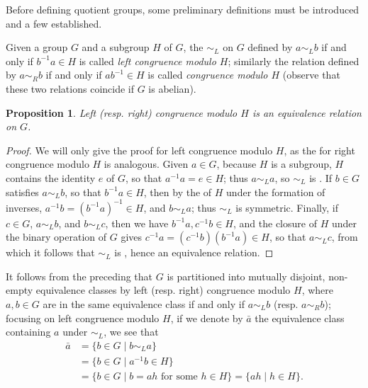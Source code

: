 \documentclass[12pt]{article}
\theoremstyle{plain}
\newtheorem*{proposition*}{Proposition}
\theoremstyle{definition}
\newcommand{\set}[1]{\{#1\}}
\begin{document}
Before defining quotient groups, some preliminary definitions must be introduced and a few  established.

Given a group $G$ and a subgroup $H$ of $G$, the  $\sim_L$ on $G$ defined by $a\sim_L b$ if and only 
if $b^{-1}a\in H$ is called \emph{left congruence modulo $H$}; similarly the relation defined by $a\sim_R b$ if 
and only if $ab^{-1}\in H$ is called \emph{ congruence modulo $H$} (observe that these two relations coincide if $G$ is abelian). 
\begin{proposition*}
Left (resp. right) congruence modulo $H$ is an equivalence relation on $G$.
\end{proposition*}
\begin{proof}
We will only give the proof for left congruence modulo $H$, as the  for right congruence modulo $H$ is analogous.
Given $a\in G$, because $H$ is a subgroup, $H$ contains the identity $e$ of $G$, so that $a^{-1}a=e\in H$; thus $a\sim_L a$, so $\sim_L$ is . If $b\in G$ satisfies $a\sim_L b$, so that $b^{-1}a\in H$, then by the  of $H$ under the formation of inverses, $a^{-1}b=(b^{-1}a)^{-1}\in H$, and $b\sim_L a$; thus $\sim_L$ is symmetric. Finally, if $c\in G$, $a\sim_L b$, and $b\sim_L c$, then we have $b^{-1}a,c^{-1}b\in H$, and the closure of $H$ under the binary operation of $G$ gives $c^{-1}a=(c^{-1}b)(b^{-1}a)\in H$, so that $a\sim_L c$, from which it follows that $\sim_L$ is , hence an equivalence relation.
\end{proof}

It follows from the preceding  that $G$ is partitioned into mutually disjoint, non-empty equivalence
classes by left (resp. right) congruence modulo $H$, where $a,b\in G$ are in the same equivalence class if and only if $a\sim_L b$ (resp. $a\sim_R b$); focusing on left congruence modulo $H$, if we denote by $\bar{a}$ the equivalence class containing $a$ under $\sim_L$, we see that
\begin{equation*}
\begin{split}
\bar{a}&=\set{b\in G\mid b\sim_L a}\\
&=\set{b\in G\mid a^{-1}b\in H}\\
&=\set{b\in G\mid b=ah\text{ for some }h\in H}=\set{ah\mid h\in H}\text{.}
\end{split}
\end{equation*}
\end{document}
